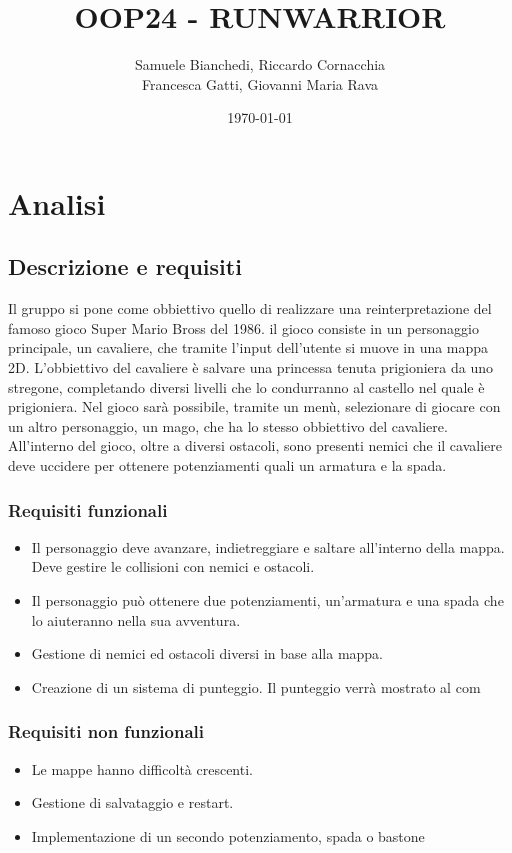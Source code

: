 \documentclass[a4paper,12pt]{report}
\title{OOP24 - RUNWARRIOR}
\author{
    Samuele Bianchedi, Riccardo Cornacchia\\
    Francesca Gatti, Giovanni Maria Rava}
\date{\today}
\begin{document}
\maketitle
\chapter{Analisi}
\section{Descrizione e requisiti}
Il gruppo si pone come obbiettivo quello di realizzare una reinterpretazione del famoso gioco 
Super Mario Bross del 1986. il gioco consiste in un personaggio principale, un cavaliere, che tramite 
l'input dell'utente si muove in una mappa 2D. L'obbiettivo del cavaliere è salvare una princessa tenuta
prigioniera da uno stregone, completando diversi livelli che lo condurranno al castello nel quale è 
prigioniera. Nel gioco sarà possibile, tramite un menù, selezionare di giocare con un altro personaggio, 
un mago, che ha lo stesso obbiettivo del cavaliere. All'interno del gioco, oltre a diversi ostacoli, sono presenti nemici che il 
cavaliere deve uccidere per ottenere potenziamenti quali un armatura e la spada.
\subsection*{Requisiti funzionali}
\begin{itemize}
    \item Il personaggio deve avanzare, indietreggiare e saltare all'interno della mappa. Deve gestire le collisioni con nemici e ostacoli.
    \item Il personaggio può ottenere due potenziamenti, un'armatura e una spada che lo aiuteranno nella sua avventura.
    \item Gestione di nemici ed ostacoli diversi in base alla mappa.
    \item Creazione di un sistema di punteggio. Il punteggio verrà mostrato al com
\end{itemize}
\newpage
\subsection*{Requisiti non funzionali}
\begin{itemize}
    \item Le mappe hanno difficoltà crescenti. 
    \item Gestione di salvataggio e restart.
    \item Implementazione di un secondo potenziamento, spada o bastone
\end{itemize}
\end{document}

